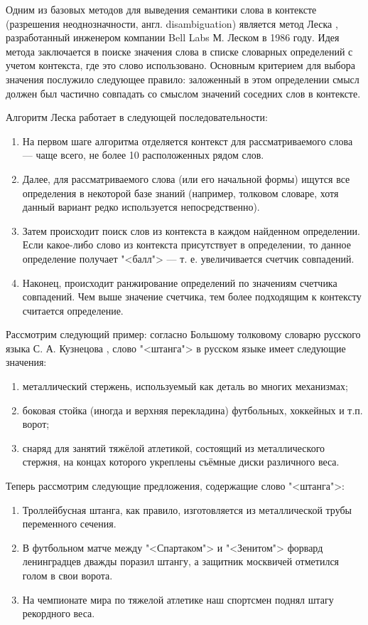 Одним из базовых методов для выведения семантики слова в контексте (разрешения неоднозначности, англ. disambiguation)
является метод Леска \cite{10.1145/318723.318728}, разработанный инженером компании Bell Labs М. Леском в 1986 году.
Идея метода заключается в поиске значения слова в списке словарных определений с учетом контекста, где это слово использовано. 
Основным критерием для выбора значения послужило следующее правило: заложенный в этом определении смысл должен был частично
совпадать со смыслом значений соседних слов в контексте.

Алгоритм Леска работает в следующей последовательности:
\begin{enumerate}[1)]
    \item На первом шаге алгоритма отделяется контекст для рассматриваемого слова --- чаще всего, не более 10 расположенных 
        рядом слов.
    \item Далее, для рассматриваемого слова (или его начальной формы) ищутся все определения в некоторой базе знаний 
        (например, толковом словаре, хотя данный вариант редко используется непосредственно).
    \item Затем происходит поиск слов из контекста в каждом найденном определении. Если какое-либо слово из контекста
        присутствует в определении, то данное определение получает "<балл"> --- т. е. увеличивается счетчик совпадений.
    \item Наконец, происходит ранжирование определений по значениям счетчика совпадений. Чем выше значение счетчика, тем более
        подходящим к контексту считается определение.
\end{enumerate}

Рассмотрим следующий пример: согласно Большому толковому словарю русского языка С. А. Кузнецова \cite{kuznecov2008noveishiy},
слово "<штанга"> в русском языке имеет следующие значения:
\begin{enumerate}[1)]
    \item металлический стержень, используемый как деталь во многих механизмах;
    \item боковая стойка (иногда и верхняя перекладина) футбольных, хоккейных и т.п. ворот;
    \item снаряд для занятий тяжёлой атлетикой, состоящий из металлического стержня, на концах которого укреплены
        съёмные диски различного веса.
\end{enumerate}

Теперь рассмотрим следующие предложения, содержащие слово "<штанга">:
\begin{enumerate}[1)]
    \item Троллейбусная штанга, как правило, изготовляется из металлической трубы переменного сечения.
    \item В футбольном матче между "<Спартаком"> и "<Зенитом"> форвард ленинградцев дважды поразил штангу, а защитник москвичей
    отметился голом в свои ворота.
    \item На чемпионате мира по тяжелой атлетике наш спортсмен поднял штагу рекордного веса.
\end{enumerate}

